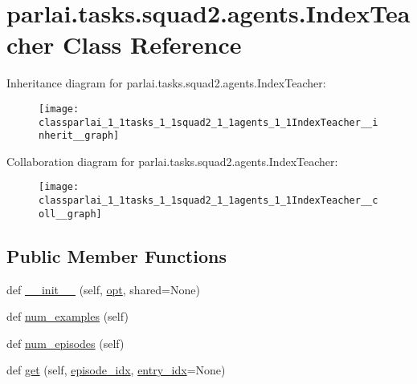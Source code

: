 \hypertarget{classparlai_1_1tasks_1_1squad2_1_1agents_1_1IndexTeacher}{}\section{parlai.\+tasks.\+squad2.\+agents.\+Index\+Teacher Class Reference}
\label{classparlai_1_1tasks_1_1squad2_1_1agents_1_1IndexTeacher}


Inheritance diagram for parlai.\+tasks.\+squad2.\+agents.\+Index\+Teacher\+:
\nopagebreak
\begin{figure}[H]
\begin{center}
\leavevmode
\texttt{[image: classparlai\_1\_1tasks\_1\_1squad2\_1\_1agents\_1\_1IndexTeacher\_\_inherit\_\_graph]}
\end{center}
\end{figure}


Collaboration diagram for parlai.\+tasks.\+squad2.\+agents.\+Index\+Teacher\+:
\nopagebreak
\begin{figure}[H]
\begin{center}
\leavevmode
\texttt{[image: classparlai\_1\_1tasks\_1\_1squad2\_1\_1agents\_1\_1IndexTeacher\_\_coll\_\_graph]}
\end{center}
\end{figure}
\subsection*{Public Member Functions}
\begin{DoxyCompactItemize}
\item 
def \hyperlink{classparlai_1_1tasks_1_1squad2_1_1agents_1_1IndexTeacher_a11e053a7da91de71216a538505257ae2}{\+\_\+\+\_\+init\+\_\+\+\_\+} (self, \hyperlink{classparlai_1_1core_1_1agents_1_1Teacher_a3ce6243860ce978a897922863ed32fa4}{opt}, shared=None)
\item 
def \hyperlink{classparlai_1_1tasks_1_1squad2_1_1agents_1_1IndexTeacher_af85b15f1fe388fef825a5df688eac522}{num\+\_\+examples} (self)
\item 
def \hyperlink{classparlai_1_1tasks_1_1squad2_1_1agents_1_1IndexTeacher_aabf2ad3a489d5b1547afa2aaac7b5b79}{num\+\_\+episodes} (self)
\item 
def \hyperlink{classparlai_1_1tasks_1_1squad2_1_1agents_1_1IndexTeacher_a55e2945cb45316a80fc158e8f13eb0ac}{get} (self, \hyperlink{classparlai_1_1core_1_1teachers_1_1FixedDialogTeacher_afd4ebab8063eb42d182d30a1a41f133e}{episode\+\_\+idx}, \hyperlink{classparlai_1_1core_1_1teachers_1_1FixedDialogTeacher_ae3201b15f3c3b46a2f3511bad9b43e7d}{entry\+\_\+idx}=None)
\end{DoxyCompactItemize}
